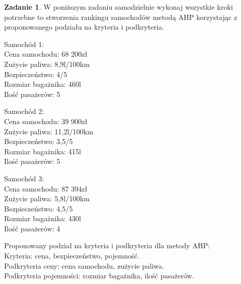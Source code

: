 \documentclass{article}[UTF8]
\theoremstyle{definition}
\newtheorem{zad}{Zadanie}
\begin{document}
\begin{zad}

W poniższym zadaniu samodzielnie wykonaj wszystkie kroki potrzebne to stworzenia rankingu samochodów metodą AHP korzystając z proponowanego podziału na kryteria i podkryteria.

Samochód 1:\\
Cena samochodu: 68 200zł\\
Zużycie paliwa: 8,9l/100km\\
Bezpieczeństwo: 4/5\\
Rozmiar bagażnika: 460l\\
Ilość pasażerów: 5

Samochód 2:\\
Cena samochodu: 39 900zł\\
Zużycie paliwa: 11,2l/100km\\
Bezpieczeństwo: 3,5/5\\
Rozmiar bagażnika: 415l\\
Ilość pasażerów: 5

Samochód 3:\\
Cena samochodu: 87 394zł\\
Zużycie paliwa: 5,8l/100km\\
Bezpieczeństwo: 4,5/5\\
Rozmiar bagażnika: 430l\\
Ilość pasażerów: 4

Proponowany podział na kryteria i podkryteria dla metody AHP:\\
Kryteria: cena, bezpieczeństwo, pojemność.\\
Podkryteria ceny: cena samochodu, zużycie paliwa.\\
Podkryteria pojemności: rozmiar bagażnika, ilość pasażerów. 

\end{zad}
\end{document}
